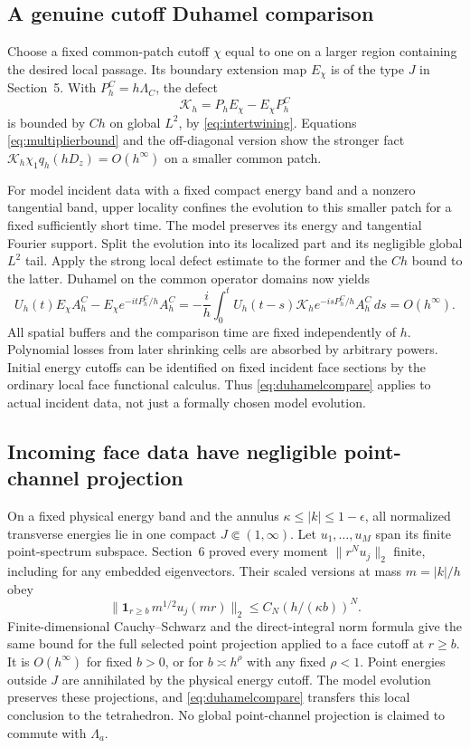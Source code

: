 \documentclass[11pt]{amsart}
\numberwithin{equation}{section}
\theoremstyle{remark}
\newcommand{\one}{\mathbf{1}}
\begin{document}
\subsection{A genuine cutoff Duhamel comparison}
Choose a fixed common-patch cutoff $\chi$ equal to one on a larger region containing the desired local passage. Its boundary extension map $E_\chi$ is of the type $J$ in Section~5. With $P_h^C=h\Lambda_C$, the defect
\begin{equation}\label{eq:defect}
\mathcal K_h=P_hE_\chi-E_\chi P_h^C
\end{equation}
is bounded by $Ch$ on global $L^2$, by \eqref{eq:intertwining}. Equations \eqref{eq:multiplierbound} and the off-diagonal version show the stronger fact $\mathcal K_h\chi_1q_h(hD_z)=O(h^\infty)$ on a smaller common patch.

For model incident data with a fixed compact energy band and a nonzero tangential band, upper locality confines the evolution to this smaller patch for a fixed sufficiently short time. The model preserves its energy and tangential Fourier support. Split the evolution into its localized part and its negligible global $L^2$ tail. Apply the strong local defect estimate to the former and the $Ch$ bound to the latter. Duhamel on the common operator domains now yields
\begin{equation}\label{eq:duhamelcompare}
U_h(t)E_\chi A_h^C-E_\chi e^{-itP_h^C/h}A_h^C=-\frac ih\int_0^tU_h(t-s)\mathcal K_he^{-isP_h^C/h}A_h^C\,ds=O(h^\infty) .
\end{equation}
All spatial buffers and the comparison time are fixed independently of $h$. Polynomial losses from later shrinking cells are absorbed by arbitrary powers. Initial energy cutoffs can be identified on fixed incident face sections by the ordinary local face functional calculus. Thus \eqref{eq:duhamelcompare} applies to actual incident data, not just a formally chosen model evolution.

\subsection{Incoming face data have negligible point-channel projection}
On a fixed physical energy band and the annulus $\kappa\le|k|\le1-\epsilon$, all normalized transverse energies lie in one compact $J\Subset(1,\infty)$. Let $u_1,\dots,u_M$ span its finite point-spectrum subspace. Section~6 proved every moment $\|r^Nu_j\|_2$ finite, including for any embedded eigenvectors. Their scaled versions at mass $m=|k|/h$ obey
\begin{equation}\label{eq:pointtail}
\|\one_{r\ge b}\,m^{1/2}u_j(mr)\|_2\le C_N(h/(\kappa b))^N .
\end{equation}
Finite-dimensional Cauchy--Schwarz and the direct-integral norm formula give the same bound for the full selected point projection applied to a face cutoff at $r\ge b$. It is $O(h^\infty)$ for fixed $b>0$, or for $b\asymp h^\rho$ with any fixed $\rho<1$. Point energies outside $J$ are annihilated by the physical energy cutoff. The model evolution preserves these projections, and \eqref{eq:duhamelcompare} transfers this local conclusion to the tetrahedron. No global point-channel projection is claimed to commute with $\Lambda_a$.
\end{document}
